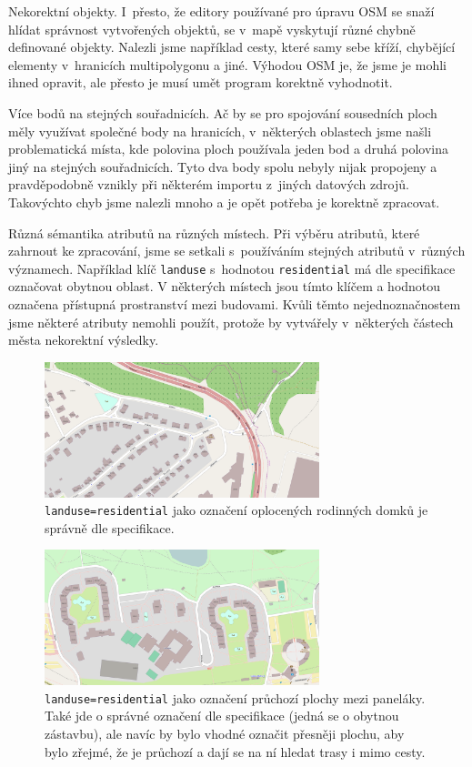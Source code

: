 \smallskip
{\tuc Nekorektní objekty.} I~přesto, že editory používané pro úpravu OSM se snaží
hlídat správnost vytvořených objektů, se v~mapě vyskytují různé chybně
definované objekty. Nalezli jsme například cesty, které samy sebe kříží,
chybějící elementy v~hranicích multipolygonu a jiné. Výhodou OSM je, že jsme je
mohli ihned opravit, ale přesto je musí umět program korektně vyhodnotit.

\smallskip
{\tuc Více bodů na stejných souřadnicích.} Ač by se pro spojování sousedních
ploch měly využívat společné body na hranicích, v~některých oblastech jsme našli
problematická místa, kde polovina ploch používala jeden bod a druhá polovina
jiný na stejných souřadnicích. Tyto dva body spolu nebyly nijak propojeny a
pravděpodobně vznikly při některém importu z~jiných datových zdrojů. Takovýchto
chyb jsme nalezli mnoho a je opět potřeba je korektně zpracovat.

\smallskip
{\tuc Různá sémantika atributů na různých místech.} Při výběru atributů, které
zahrnout ke zpracování, jsme se setkali s~používáním stejných atributů v~různých
významech. Například klíč \verb|landuse| s~hodnotou \verb|residential| má dle
specifikace \cite{osmfeatures} označovat obytnou oblast. V některých místech
jsou tímto klíčem a hodnotou označena přístupná prostranství mezi budovami. 
Kvůli těmto nejednoznačnostem jsme některé atributy nemohli použít, protože by
vytvářely v~některých částech města nekorektní výsledky.
\begin{figure}
	\centering
	\includegraphics[width=80mm]{../img/resident-nepruch.pdf}
	\caption{\texttt{landuse=residential} jako označení oplocených rodinných
	domků je správně dle specifikace.}
	\label{fig:resident-nepruch}
\end{figure}
\begin{figure}
	\centering
	\includegraphics[width=80mm]{../img/resident-plocha.pdf}
	\caption{\texttt{landuse=residential} jako označení průchozí plochy mezi
	paneláky. Také jde o správné označení dle specifikace (jedná se o
	obytnou zástavbu), ale navíc by bylo vhodné označit přesněji plochu, aby
	bylo zřejmé, že je průchozí a dají se na ní hledat trasy i mimo cesty.}
	\label{fig:resident-volno}
\end{figure}

